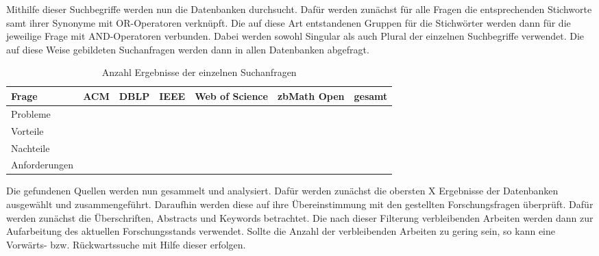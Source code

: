 Mithilfe dieser Suchbegriffe werden nun die Datenbanken durchsucht. Dafür werden zunächst für alle Fragen die entsprechenden Stichworte samt ihrer Synonyme mit OR-Operatoren verknüpft. Die auf diese Art entstandenen Gruppen für die Stichwörter werden dann für die jeweilige Frage mit AND-Operatoren verbunden. Dabei werden sowohl Singular als auch Plural der einzelnen Suchbegriffe verwendet. Die auf diese Weise gebildeten Suchanfragen werden dann in allen Datenbanken abgefragt.

\begin{table}[htbp]
    \centering
    \begin{tabular}{|l|c|c|c|c|c|c|}
        \hline
        Frage         & ACM & DBLP & IEEE & Web of Science & zbMath Open & gesamt \\
        \hline
        Probleme      &     &      &      &                &             &        \\
        \hline
        Vorteile      &     &      &      &                &             &        \\
        \hline
        Nachteile     &     &      &      &                &             &        \\
        \hline
        Anforderungen &     &      &      &                &             &        \\
        \hline
    \end{tabular}
    \caption{Anzahl Ergebnisse der einzelnen Suchanfragen}
    \label{table:amount-search-results}
\end{table}

Die gefundenen Quellen werden nun gesammelt und analysiert. Dafür werden zunächst die obersten X Ergebnisse der Datenbanken ausgewählt und zusammengeführt. Daraufhin werden diese auf ihre Übereinstimmung mit den gestellten Forschungsfragen überprüft. Dafür werden zunächst die Überschriften, Abstracts und Keywords betrachtet. Die nach dieser Filterung verbleibenden Arbeiten werden dann zur Aufarbeitung des aktuellen Forschungsstands verwendet. Sollte die Anzahl der verbleibenden Arbeiten zu gering sein, so kann eine Vorwärts- bzw. Rückwartssuche mit Hilfe dieser erfolgen.